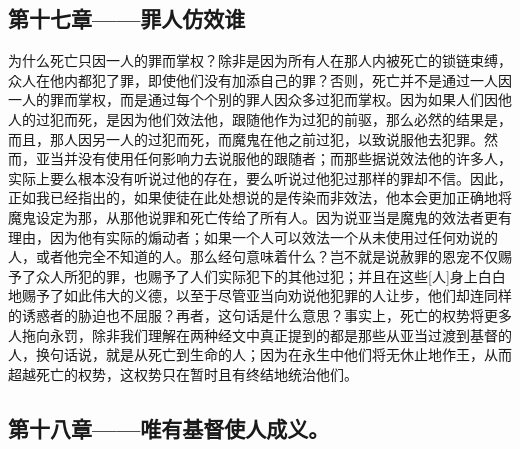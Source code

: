 
\subsection{第十七章——罪人仿效谁}

 为什么死亡只因一人的罪而掌权？除非是因为所有人在那人内被死亡的锁链束缚，众人在他内都犯了罪，即使他们没有加添自己的罪？否则，死亡并不是通过一人因一人的罪而掌权，而是通过每个个别的罪人因众多过犯而掌权。因为如果人们因他人的过犯而死，是因为他们效法他，跟随他作为过犯的前驱，那么必然的结果是，而且，那人因另一人的过犯而死，而魔鬼在他之前过犯，以致说服他去犯罪。然而，亚当并没有使用任何影响力去说服他的跟随者；而那些据说效法他的许多人，实际上要么根本没有听说过他的存在，要么听说过他犯过那样的罪却不信。因此，正如我已经指出的，如果使徒在此处想说的是传染而非效法，他本会更加正确地将魔鬼设定为那，从那他说罪和死亡传给了所有人。因为说亚当是魔鬼的效法者更有理由，因为他有实际的煽动者；如果一个人可以效法一个从未使用过任何劝说的人，或者他完全不知道的人。那么经句意味着什么？岂不就是说赦罪的恩宠不仅赐予了众人所犯的罪，也赐予了人们实际犯下的其他过犯；并且在这些[人]身上白白地赐予了如此伟大的义德，以至于尽管亚当向劝说他犯罪的人让步，他们却连同样的诱惑者的胁迫也不屈服？再者，这句话是什么意思？事实上，死亡的权势将更多人拖向永罚，除非我们理解在两种经文中真正提到的都是那些从亚当过渡到基督的人，换句话说，就是从死亡到生命的人；因为在永生中他们将无休止地作王，从而超越死亡的权势，这权势只在暂时且有终结地统治他们。\par


\subsection{第十八章——唯有基督使人成义。}

